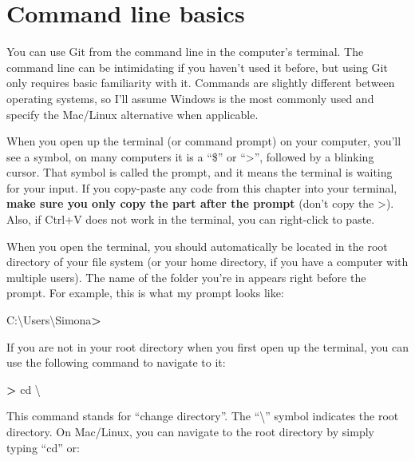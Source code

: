 \documentclass[
]{book}
\newenvironment{Shaded}{\begin{snugshade}}{\end{snugshade}}
\newcommand{\DataTypeTok}[1]{\textcolor[rgb]{0.13,0.29,0.53}{#1}}
\newcommand{\ExtensionTok}[1]{#1}
\newcommand{\NormalTok}[1]{#1}
\newcommand{\OperatorTok}[1]{\textcolor[rgb]{0.81,0.36,0.00}{\textbf{#1}}}
\begin{document}
\hypertarget{command-line-basics}{%
\section{Command line basics}\label{command-line-basics}}

You can use Git from the command line in the computer's terminal. The command line can be intimidating if you haven't used it before, but using Git only requires basic familiarity with it. Commands are slightly different between operating systems, so I'll assume Windows is the most commonly used and specify the Mac/Linux alternative when applicable.

When you open up the terminal (or command prompt) on your computer, you'll see a symbol, on many computers it is a ``\$'' or ``\textgreater{}'', followed by a blinking cursor. That symbol is called the prompt, and it means the terminal is waiting for your input. If you copy-paste any code from this chapter into your terminal,
\textbf{make sure you only copy the part after the prompt} (don't copy the \textgreater).
Also, if Ctrl+V does not work in the terminal, you can right-click to paste.

When you open the terminal, you should automatically be located in the root directory of your file system (or your home directory, if you have a computer with multiple users). The name of the folder you're in appears right before the prompt. For example, this is what my prompt looks like:

\begin{Shaded}
\begin{Highlighting}[]
\ExtensionTok{C:\textbackslash{}Users\textbackslash{}Simona}\OperatorTok{\textgreater{}}
\end{Highlighting}
\end{Shaded}

If you are not in your root directory when you first open up the terminal, you can use the following command to navigate to it:

\begin{Shaded}
\begin{Highlighting}[]
\OperatorTok{\textgreater{}}\NormalTok{ cd }\DataTypeTok{\textbackslash{}}
\end{Highlighting}
\end{Shaded}

This command stands for ``change directory''. The ``\textbackslash{}'' symbol indicates the root directory. On Mac/Linux, you can navigate to the root directory by simply typing ``cd'' or:
\end{document}
